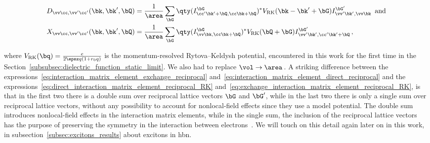 \begin{subequations}
    \label{eq:interaction_matrix_elements_reciprocal_RK}
    \begin{align}
        D_{\vv \cc , \vv ' \cc '}(\bk,\bk',\bQ) &= \frac{1}{\area} \sum_{\bG} \qty(I^{\bG}_{\cc ' \bk'+\bQ, \cc  \bk+\bQ})^* V_{\text{RK}}(\bk - \bk' + \bG) I^{\bG'}_{\vv ' \bk',\vv \bk} \label{eq:direct_interaction_matrix_element_reciprocal_RK}\,\text{ and} \\
        X_{\vv \cc , \vv ' \cc '}(\bk,\bk',\bQ) &= \frac{1}{\area} \sum_{\bG} \qty(I^{\bG}_{\vv \bk, \cc  \bk+\bQ})^* V_{\text{RK}}(\bQ + \bG) I^{\bG'}_{\vv ' \bk',  \cc ' \bk' + \bQ} \,, \label{eq:exchange_interaction_matrix_element_reciprocal_RK}
    \end{align}
\end{subequations}

\noindent where $V_{\text{RK}}(\bq) = \frac{e}{2\epsz q\left(1+r_0 q\right)}$ is the momentum-resolved Rytova--Keldysh potential, encountered in this work for the first time in the Section~\ref{subsubsec:dielectric_function_static_limit}.
We also had to replace $\vol \to \area$\,.
A striking difference between the expressions~\eqref{eq:interaction_matrix_element_exchange_reciprocal} and~\eqref{eq:interaction_matrix_element_direct_reciprocal} and the expressions~\eqref{eq:direct_interaction_matrix_element_reciprocal_RK} and~\eqref{eq:exchange_interaction_matrix_element_reciprocal_RK}, is that in the first two there is a double sum over reciprocal lattice vectors $\bG$ and $\bG'$, while in the last two there is only a single sum over reciprocal lattice vectors, without any possibility to account for nonlocal-field effects since they use a model potential.
The double sum introduces nonlocal-field effects in the interaction matrix elements, while in the single sum, the inclusion of the reciprocal lattice vectors has the purpose of preserving the symmetry in the interaction between electrons~\cite{Ridolfi_2015}. %
We will touch on this detail again later on in this work, in subsection~\ref{subsec:excitons_results} about excitons in \gls{hbn}.

